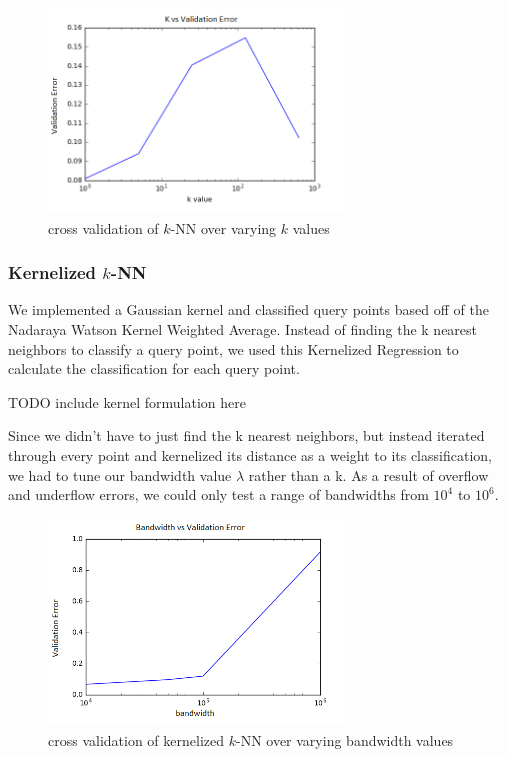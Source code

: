 ﻿\documentclass{article} %
\begin{document}
\begin{figure}[h]
\centering
\includegraphics[width=0.7\textwidth]{knn-c-cv.png}
\caption{cross validation of $k$-NN over varying $k$ values}
\label{fig:knn-c-cv}
\end{figure}

\subsubsection{Kernelized $k$-NN}
We implemented a Gaussian kernel and classified query points
based off of the Nadaraya Watson Kernel Weighted Average. Instead of finding
the k nearest neighbors to classify a query point, we used this Kernelized
Regression to calculate the classification for each query point.

TODO include kernel formulation here

Since we didn’t have to just find the k nearest neighbors, but instead
iterated through every point and kernelized its distance as a weight to
its classification, we had to tune our bandwidth value $\lambda$ rather than a k.
As a result of overflow and underflow errors, we could only test a range
of bandwidths from $10^4$ to $10^6$. 


\begin{figure}[h]
\centering
\includegraphics[width=0.7\textwidth]{knn-kernel-bandwidth-cv.png}
\caption{cross validation of kernelized $k$-NN over varying bandwidth values}
\label{fig:knn-kernel-bandwidth-cv}
\end{figure}
\end{document}
